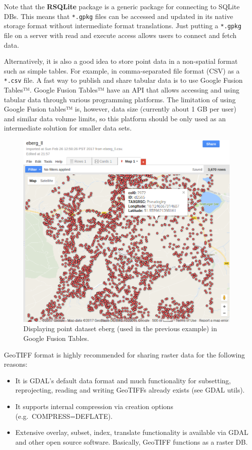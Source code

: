 \documentclass[10pt,b5paper,]{book}
\providecommand{\tightlist}{%
  \setlength{\itemsep}{0pt}\setlength{\parskip}{0pt}}
\theoremstyle{definition}
\theoremstyle{definition}
\theoremstyle{definition}
\theoremstyle{remark}
\begin{document}
Note that the \textbf{RSQLite} package is a generic package for
connecting to SQLite DBs. This means that \texttt{*.gpkg} files can be
accessed and updated in its native storage format without intermediate
format translations. Just putting a \texttt{*.gpkg} file on a server
with read and execute access allows users to connect and fetch data.

Alternatively, it is also a good idea to store point data in a
non-spatial format such as simple tables. For example, in
comma-separated file format (CSV) as a \texttt{*.csv} file. A fast way
to publish and share tabular data is to use Google Fusion Tables™.
Google Fusion Tables™ have an API that allows accessing and using
tabular data through various programming platforms. The limitation of
using Google Fusion tables™ is, however, data size (currently about 1 GB
per user) and similar data volume limits, so this platform should be
only used as an intermediate solution for smaller data sets.

\begin{figure}
\centering
\includegraphics{images/Data_sharing_eberg.png}
\caption{Displaying point dataset eberg (used in the previous example)
in Google Fusion Tables.}
\end{figure}

GeoTIFF format is highly recommended for sharing raster data for the
following reasons:

\begin{itemize}
\tightlist
\item
  It is GDAL's default data format and much functionality for
  subsetting, reprojecting, reading and writing GeoTIFFs already exists
  (see GDAL utils).
\item
  It supports internal compression via creation options
  (e.g.~COMPRESS=DEFLATE).
\item
  Extensive overlay, subset, index, translate functionality is available
  via GDAL and other open source software. Basically, GeoTIFF functions
  as a raster DB.
\end{itemize}
\end{document}
